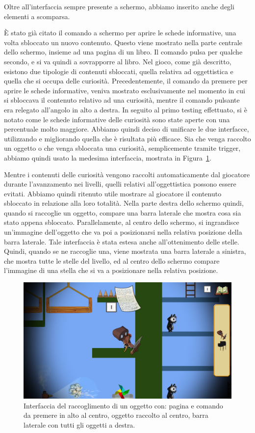 Oltre all’interfaccia sempre presente a schermo, abbiamo inserito anche degli elementi a scomparsa.

È stato già citato il comando a schermo per aprire le schede informative, una volta sbloccato un nuovo contenuto. Questo viene mostrato nella parte centrale dello schermo, insieme ad una pagina di un libro. Il comando pulsa per qualche secondo, e si va quindi a sovrapporre al libro.
Nel gioco, come già descritto, esistono due tipologie di contenuti sbloccati, quella relativa ad oggettistica e quella che si occupa delle curiosità. Precedentemente, il comando da premere per aprire le schede informative, veniva mostrato esclusivamente nel momento in cui si sbloccava il contenuto relativo ad una curiosità, mentre il comando pulsante era relegato all’angolo in alto a destra. In seguito al primo testing effettuato, si è notato come le schede informative delle curiosità sono state aperte con una percentuale molto maggiore. Abbiamo quindi deciso di unificare le due interfacce, utilizzando e migliorando quella che è risultata più efficace.
Sia che venga raccolto un oggetto o che venga sbloccata una curiosità, semplicemente tramite trigger, abbiamo quindi usato la medesima interfaccia, mostrata in Figura~\ref{fig:interfaccia_oggetti}.

Mentre i contenuti delle curiosità vengono raccolti automaticamente dal giocatore durante l’avanzamento nei livelli, quelli relativi all’oggettistica possono essere evitati. Abbiamo quindi ritenuto utile mostrare al giocatore il contenuto sbloccato in relazione alla loro totalità. Nella parte destra dello schermo quindi, quando si raccoglie un oggetto, compare una barra laterale che mostra cosa sia stato appena sbloccato.
Parallelamente, al centro dello schermo, si ingrandisce un’immagine dell’oggetto che va poi a posizionarsi nella relativa posizione della barra laterale.
Tale interfaccia è stata estesa anche all’ottenimento delle stelle. Quindi, quando se ne raccoglie una, viene mostrata una barra laterale a sinistra, che mostra tutte le stelle del livello, ed al centro dello schermo compare l’immagine di una stella che si va a posizionare nella relativa posizione.


\begin{figure}%
	\centering
	\includegraphics[width= 0.9\columnwidth]{images/gameDesign/57_interfaccia.jpg}
	\caption{Interfaccia del raccoglimento di un oggetto con: pagina e comando da premere in alto al centro, oggetto raccolto al centro, barra laterale con tutti gli oggetti a destra.}
	\label{fig:interfaccia_oggetti}
\end{figure}


